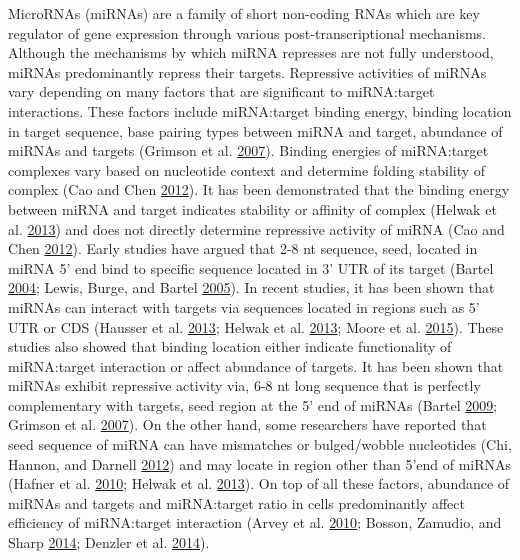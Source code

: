 \documentclass[]{article}
\begin{document}
MicroRNAs (miRNAs) are a family of short non-coding RNAs which are key
regulator of gene expression through various post-transcriptional
mechanisms. Although the mechanisms by which miRNA represses are not
fully understood, miRNAs predominantly repress their targets. Repressive
activities of miRNAs vary depending on many factors that are significant
to miRNA:target interactions. These factors include miRNA:target binding
energy, binding location in target sequence, base pairing types between
miRNA and target, abundance of miRNAs and targets (Grimson et al.
\protect\hyperlink{ref-grimson_microrna_2007}{2007}). Binding energies
of miRNA:target complexes vary based on nucleotide context and determine
folding stability of complex (Cao and Chen
\protect\hyperlink{ref-cao_predicting_2012}{2012}). It has been
demonstrated that the binding energy between miRNA and target indicates
stability or affinity of complex (Helwak et al.
\protect\hyperlink{ref-helwak_mapping_2013}{2013}) and does not directly
determine repressive activity of miRNA (Cao and Chen
\protect\hyperlink{ref-cao_predicting_2012}{2012}). Early studies have
argued that 2-8 nt sequence, seed, located in miRNA 5' end bind to
specific sequence located in 3' UTR of its target (Bartel
\protect\hyperlink{ref-bartel_micrornas_2004}{2004}; Lewis, Burge, and
Bartel \protect\hyperlink{ref-lewis_conserved_2005}{2005}). In recent
studies, it has been shown that miRNAs can interact with targets via
sequences located in regions such as 5' UTR or CDS (Hausser et al.
\protect\hyperlink{ref-hausser_analysis_2013}{2013}; Helwak et al.
\protect\hyperlink{ref-helwak_mapping_2013}{2013}; Moore et al.
\protect\hyperlink{ref-moore_mirnatarget_2015}{2015}). These studies
also showed that binding location either indicate functionality of
miRNA:target interaction or affect abundance of targets. It has been
shown that miRNAs exhibit repressive activity via, 6-8 nt long sequence
that is perfectly complementary with targets, seed region at the 5' end
of miRNAs (Bartel \protect\hyperlink{ref-bartel_micrornas:_2009}{2009};
Grimson et al. \protect\hyperlink{ref-grimson_microrna_2007}{2007}). On
the other hand, some researchers have reported that seed sequence of
miRNA can have mismatches or bulged/wobble nucleotides (Chi, Hannon, and
Darnell \protect\hyperlink{ref-chi2012alternative}{2012}) and may locate
in region other than 5'end of miRNAs (Hafner et al.
\protect\hyperlink{ref-hafner_transcriptome-wide_2010}{2010}; Helwak et
al. \protect\hyperlink{ref-helwak_mapping_2013}{2013}). On top of all
these factors, abundance of miRNAs and targets and miRNA:target ratio in
cells predominantly affect efficiency of miRNA:target interaction (Arvey
et al. \protect\hyperlink{ref-arvey_target_2010}{2010}; Bosson, Zamudio,
and Sharp \protect\hyperlink{ref-bosson_endogenous_2014}{2014}; Denzler
et al. \protect\hyperlink{ref-denzler_assessing_2014}{2014}).
\end{document}
